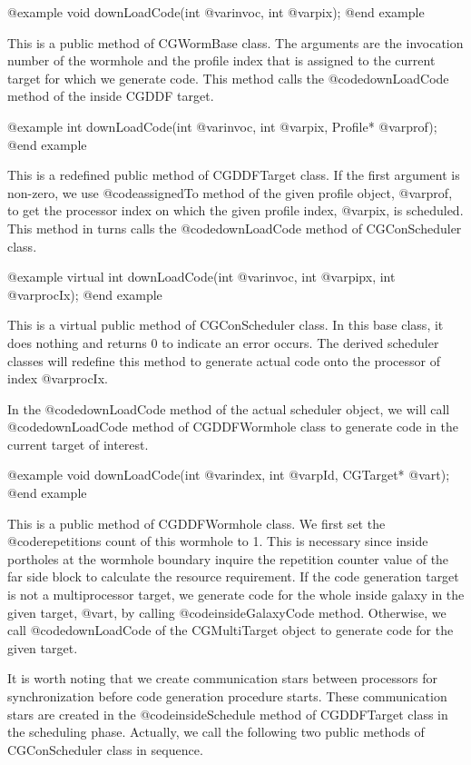 {@example
void downLoadCode(int @var{invoc}, int @var{pix});
@end example

This is a public method of CGWormBase class. The arguments are the
invocation number of the wormhole and the profile index that is assigned
to the current target for which we generate code.
This method calls the @code{downLoadCode} method of the inside CGDDF target.

@example
int downLoadCode(int @var{invoc}, int @var{pix},  Profile* @var{prof});
@end example

This is a redefined public method of CGDDFTarget class.
If the first argument is non-zero, we use @code{assignedTo} method of the
given profile object, @var{prof}, to get the processor index on 
which the given profile index, @var{pix}, is scheduled. This method in turns
calls the @code{downLoadCode} method of CGConScheduler class.

@example
virtual int downLoadCode(int @var{invoc}, int @var{pipx}, int @var{procIx});
@end example

This is a virtual public method of CGConScheduler class. In this base class,
it does nothing and returns 0 to indicate an error occurs. The derived
scheduler classes will redefine this method to generate actual code onto
the processor of index @var{procIx}.

In the @code{downLoadCode} method of the actual scheduler object, we will
call @code{downLoadCode} method of CGDDFWormhole class to generate code
in the current target of interest.

@example
void downLoadCode(int @var{index}, int @var{pId}, CGTarget* @var{t});
@end example

This is a public method of CGDDFWormhole class. We first set the
@code{repetitions} count of this wormhole to 1. This is necessary
since inside portholes at the wormhole boundary inquire the repetition
counter value of the far side block to calculate the resource requirement.
If the code generation target is not a multiprocessor target, 
we generate code for the
whole inside galaxy in the given target, @var{t}, by calling
@code{insideGalaxyCode} method. Otherwise, we call @code{downLoadCode}
of the CGMultiTarget object to generate code for the given target.

It is worth noting that we create communication stars between processors
for synchronization before code generation procedure starts. These
communication stars are created in the @code{insideSchedule} method
of CGDDFTarget class in the scheduling phase. Actually, we call
the following two public methods of CGConScheduler class in sequence.

}

